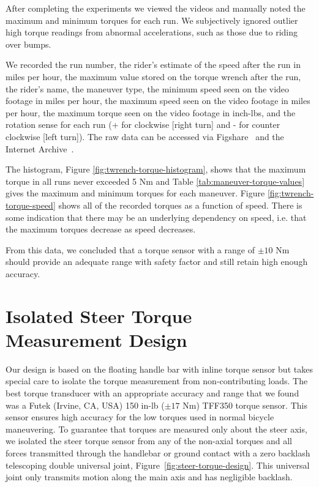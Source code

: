 \documentclass[10pt]{article}
\begin{document}
After completing the experiments we viewed the videos and manually noted the
maximum and minimum torques for each run. We subjectively ignored outlier high
torque readings from abnormal accelerations, such as those due to riding over
bumps.

We recorded the run number, the rider’s estimate of the speed after the run in
miles per hour, the maximum value stored on the torque wrench after the run,
the rider’s name, the maneuver type, the minimum speed seen on the video
footage in miles per hour, the maximum speed seen on the video footage in miles
per hour, the maximum torque seen on the video footage in inch-lbs, and the
rotation sense for each run (+ for clockwise [right turn] and - for counter
clockwise [left turn]). The raw data can be accessed via Figshare~\cite{}
and the Internet Archive~\cite{}.

The histogram, Figure \ref{fig:twrench-torque-histogram}, shows that the
maximum torque in all runs never exceeded 5 Nm and Table
\ref{tab:maneuver-torque-values} gives the maximum and minimum torques for each
maneuver. Figure \ref{fig:twrench-torque-speed} shows all of the recorded
torques as a function of speed. There is some indication that there may be an
underlying dependency on speed, i.e. that the maximum torques decrease as speed
decreases.

From this data, we concluded that a torque sensor with a range of $\pm10$ Nm
should provide an adequate range with safety factor and still retain high
enough accuracy.

\section*{Isolated Steer Torque Measurement Design}

Our design is based on the floating handle bar with inline torque sensor but
takes special care to isolate the torque measurement from non-contributing
loads. The best torque transducer with an appropriate accuracy and range that
we found was a Futek (Irvine, CA, USA) 150 in-lb ($\pm 17$ Nm) TFF350 torque
sensor. This sensor ensures high accuracy for the low torques used in normal
bicycle maneuvering. To guarantee that torques are measured only about the
steer axis, we isolated the steer torque sensor from any of the non-axial
torques and all forces transmitted through the handlebar or ground contact with
a zero backlash telescoping double universal joint,
Figure~\ref{fig:steer-torque-design}. This universal joint only transmits motion
along the main axis and has negligible backlash.
\end{document}
